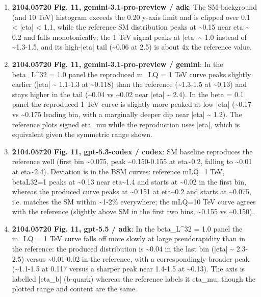 \begin{enumerate}
\item \textbf{2104.05720 Fig. 11, gemini-3.1-pro-preview / adk}: The SM-background (and 10 TeV) histogram exceeds the 0.20 y-axis limit and is clipped over 0.1 < |eta| < 1.1, while the reference SM distribution peaks at \textasciitilde{}0.15 near eta \textasciitilde{} 0.2 and falls monotonically; the 1 TeV signal peaks at |eta| \textasciitilde{} 1.0 instead of \textasciitilde{}1.3-1.5, and its high-|eta| tail (\textasciitilde{}0.06 at 2.5) is about 4x the reference value.
\item \textbf{2104.05720 Fig. 11, gemini-3.1-pro-preview / gemini}: In the beta\_L\textasciicircum{}32 = 1.0 panel the reproduced m\_LQ = 1 TeV curve peaks slightly earlier (|eta| \textasciitilde{} 1.1-1.3 at \textasciitilde{}0.118) than the reference (\textasciitilde{}1.3-1.5 at \textasciitilde{}0.13) and stays higher in the tail (\textasciitilde{}0.04 vs \textasciitilde{}0.02 near |eta| \textasciitilde{} 2.4). In the beta = 0.1 panel the reproduced 1 TeV curve is slightly more peaked at low |eta| (\textasciitilde{}0.17 vs \textasciitilde{}0.175 leading bin, with a marginally deeper dip near |eta| \textasciitilde{} 1.2). The reference plots signed eta\_mu while the reproduction uses |eta|, which is equivalent given the symmetric range shown.
\item \textbf{2104.05720 Fig. 11, gpt-5.3-codex / codex}: SM baseline reproduces the reference well (first bin \textasciitilde{}0.075, peak \textasciitilde{}0.150-0.155 at eta\textasciitilde{}0.2, falling to \textasciitilde{}0.01 at eta\textasciitilde{}2.4). Deviation is in the BSM curves: reference mLQ=1 TeV, betaL32=1 peaks at \textasciitilde{}0.13 near eta\textasciitilde{}1.4 and starts at \textasciitilde{}0.02 in the first bin, whereas the produced curve peaks at \textasciitilde{}0.151 at eta\textasciitilde{}0.2 and starts at \textasciitilde{}0.075, i.e. matches the SM within \textasciitilde{}1-2\% everywhere; the mLQ=10 TeV curve agrees with the reference (slightly above SM in the first two bins, \textasciitilde{}0.155 vs \textasciitilde{}0.150).
\item \textbf{2104.05720 Fig. 11, gpt-5.5 / adk}: In the beta\_L\textasciicircum{}32 = 1.0 panel the m\_LQ = 1 TeV curve falls off more slowly at large pseudorapidity than in the reference: the produced distribution is \textasciitilde{}0.04 in the last bin (|eta| \textasciitilde{} 2.3-2.5) versus \textasciitilde{}0.01-0.02 in the reference, with a correspondingly broader peak (\textasciitilde{}1.1-1.5 at 0.117 versus a sharper peak near 1.4-1.5 at \textasciitilde{}0.13). The axis is labelled |eta\_b| (b-quark) whereas the reference labels it eta\_mu, though the plotted range and content are the same.

\end{enumerate}
